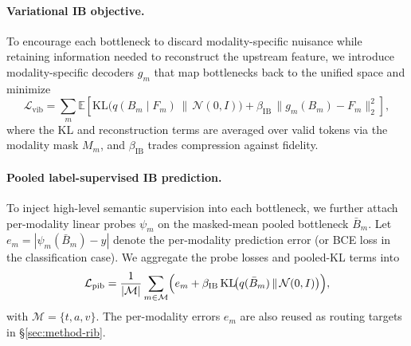 \documentclass[11pt]{article}
\begin{document}
\paragraph{Variational IB objective.}
To encourage each bottleneck to discard modality-specific nuisance while
retaining information needed to reconstruct the upstream feature, we introduce
modality-specific decoders $g_m$ that map bottlenecks back to the unified
space and minimize
\begin{equation}
  \mathcal{L}_{\mathrm{vib}}
  = \sum_{m}
    \mathbb{E}\!\left[
      \mathrm{KL}\!\bigl(q(B_m\mid F_m)\,\|\,\mathcal{N}(0,I)\bigr)
      + \beta_{\mathrm{IB}}\,\bigl\|g_m(B_m) - F_m\bigr\|_2^2
    \right],
\end{equation}
where the KL and reconstruction terms are averaged over valid tokens via the
modality mask $M_m$, and $\beta_{\mathrm{IB}}$ trades compression against
fidelity.

\paragraph{Pooled label-supervised IB prediction.}
To inject high-level semantic supervision into each bottleneck, we further
attach per-modality linear probes $\psi_m$ on the masked-mean pooled
bottleneck $\bar{B}_m$. Let $e_m = |\psi_m(\bar{B}_m) - y|$ denote the
per-modality prediction error (or BCE loss in the classification case).
We aggregate the probe losses and pooled-KL terms into
\begin{equation}
  \mathcal{L}_{\mathrm{pib}}
  = \frac{1}{|\mathcal{M}|}\sum_{m \in \mathcal{M}}
    \Bigl(e_m + \beta_{\mathrm{IB}}\,\mathrm{KL}\!\bigl(q(\bar{B}_m)\,\|\,\mathcal{N}(0,I)\bigr)\Bigr),
\end{equation}
with $\mathcal{M} = \{t, a, v\}$. The per-modality errors $e_m$ are also reused
as routing targets in \S\ref{sec:method-rib}.
\end{document}
